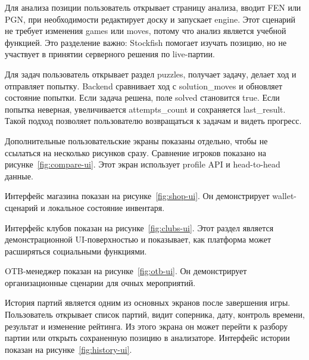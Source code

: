 Для анализа позиции пользователь открывает страницу анализа, вводит FEN или PGN, при необходимости редактирует доску и запускает engine. Этот сценарий не требует изменения games или moves, потому что анализ является учебной функцией. Это разделение важно: Stockfish помогает изучать позицию, но не участвует в принятии серверного решения по live-партии.

Для задач пользователь открывает раздел puzzles, получает задачу, делает ход и отправляет попытку. Backend сравнивает ход с solution_moves и обновляет состояние попытки. Если задача решена, поле solved становится true. Если попытка неверная, увеличивается attempts_count и сохраняется last_result. Такой подход позволяет пользователю возвращаться к задачам и видеть прогресс.



Дополнительные пользовательские экраны показаны отдельно, чтобы не ссылаться на несколько рисунков сразу. Сравнение игроков показано на рисунке~\ref{fig:compare-ui}. Этот экран использует profile API и head-to-head данные.


Интерфейс магазина показан на рисунке~\ref{fig:shop-ui}. Он демонстрирует wallet-сценарий и локальное состояние инвентаря.


Интерфейс клубов показан на рисунке~\ref{fig:clubs-ui}. Этот раздел является демонстрационной UI-поверхностью и показывает, как платформа может расширяться социальными функциями.


OTB-менеджер показан на рисунке~\ref{fig:otb-ui}. Он демонстрирует организационные сценарии для очных мероприятий.




История партий является одним из основных экранов после завершения игры. Пользователь открывает список партий, видит соперника, дату, контроль времени, результат и изменение рейтинга. Из этого экрана он может перейти к разбору партии или открыть сохраненную позицию в анализаторе. Интерфейс истории показан на рисунке~\ref{fig:history-ui}.


